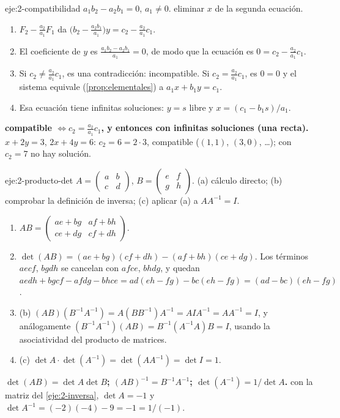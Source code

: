 \begin{solucion}{eje:2-compatibilidad}
\datos $a_1b_2-a_2b_1=0$, $a_1\neq0$.
\planteamiento eliminar $x$ de la segunda ecuación.
\pasos
\begin{enumerate}[label=\arabic*.]
  \item $F_2-\frac{a_2}{a_1}F_1$ da $\bigl(b_2-\frac{a_2b_1}{a_1}\bigr)y=c_2-\frac{a_2}{a_1}c_1$.
  \item El coeficiente de $y$ es $\frac{a_1b_2-a_2b_1}{a_1}=0$, de modo que la ecuación es $0=c_2-\frac{a_2}{a_1}c_1$.
  \item Si $c_2\neq\frac{a_2}{a_1}c_1$, es una contradicción: incompatible. Si $c_2=\frac{a_2}{a_1}c_1$, es $0=0$ y el sistema equivale (\cref{prop:elementales}) a $a_1x+b_1y=c_1$.
  \item Esa ecuación tiene infinitas soluciones: $y=s$ libre y $x=(c_1-b_1s)/a_1$.
\end{enumerate}
\resultado \textbf{compatible $\iff c_2=\frac{a_2}{a_1}c_1$, y entonces con infinitas soluciones (una recta).}
\comprobacion $x+2y=3$, $2x+4y=6$: $c_2=6=2\cdot3$, compatible ($(1,1)$, $(3,0)$, \dots); con $c_2=7$ no hay solución.
\end{solucion}

\begin{solucion}{eje:2-producto-det}
\datos $A=\begin{pmatrix}a&b\\c&d\end{pmatrix}$, $B=\begin{pmatrix}e&f\\g&h\end{pmatrix}$.
\planteamiento (a) cálculo directo; (b) comprobar la definición de inversa; (c) aplicar (a) a $AA^{-1}=I$.
\pasos
\begin{enumerate}[label=\arabic*.]
  \item $AB=\begin{pmatrix}ae+bg&af+bh\\ce+dg&cf+dh\end{pmatrix}$.
  \item $\det(AB)=(ae+bg)(cf+dh)-(af+bh)(ce+dg)$. Los términos $aecf$, $bgdh$ se cancelan con $afce$, $bhdg$, y quedan $aedh+bgcf-afdg-bhce=ad(eh-fg)-bc(eh-fg)=(ad-bc)(eh-fg)$.
  \item (b) $(AB)(B^{-1}A^{-1})=A(BB^{-1})A^{-1}=AIA^{-1}=AA^{-1}=I$, y análogamente $(B^{-1}A^{-1})(AB)=B^{-1}(A^{-1}A)B=I$, usando la asociatividad del producto de matrices.
  \item (c) $\det A\cdot\det(A^{-1})=\det(AA^{-1})=\det I=1$.
\end{enumerate}
\resultado \textbf{$\det(AB)=\det A\det B$; $(AB)^{-1}=B^{-1}A^{-1}$; $\det(A^{-1})=1/\det A$.}
\comprobacion con la matriz del \cref{eje:2-inversa}, $\det A=-1$ y $\det A^{-1}=(-2)(-4)-9=-1=1/(-1)$.
\end{solucion}

